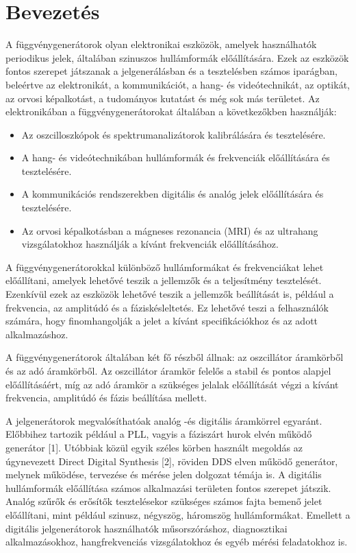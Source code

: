 \documentclass[a4paper,12pt]{article}
\begin{document}
	\section{Bevezetés}
		A függvénygenerátorok olyan elektronikai eszközök, amelyek használhatók periodikus jelek, általában szinuszos hullámformák előállítására. Ezek az eszközök fontos szerepet játszanak a jelgenerálásban és a tesztelésben számos iparágban, beleértve az elektronikát, a kommunikációt, a hang- és videótechnikát, az optikát, az orvosi képalkotást, a tudományos kutatást és még sok más területet.
		Az elektronikában a függvénygenerátorokat általában a következőkben használják:
		\begin{itemize}
		\item Az oszcilloszkópok és spektrumanalizátorok kalibrálására és tesztelésére.
		\item A hang- és videótechnikában hullámformák és frekvenciák előállítására és tesztelésére.
		\item A kommunikációs rendszerekben digitális és analóg jelek előállítására és tesztelésére.
		\item Az orvosi képalkotásban a mágneses rezonancia (MRI) és az ultrahang vizsgálatokhoz használják a kívánt frekvenciák előállításához.
		\end{itemize}
	
		A függvénygenerátorokkal különböző hullámformákat és frekvenciákat lehet előállítani, amelyek lehetővé teszik a jellemzők és a teljesítmény tesztelését. Ezenkívül ezek az eszközök lehetővé teszik a jellemzők beállítását is, például a frekvencia, az amplitúdó és a fáziskésleltetés. Ez lehetővé teszi a felhasználók számára, hogy finomhangolják a jelet a kívánt specifikációkhoz és az adott alkalmazáshoz.
		
		A függvénygenerátorok általában két fő részből állnak: az oszcillátor áramkörből és az adó áramkörből. Az oszcillátor áramkör felelős a stabil és pontos alapjel előállításáért, míg az adó áramkör a szükséges jelalak előállítását végzi a kívánt frekvencia, amplitúdó és fázis beállítása mellett. 
		
		A jelgenerátorok megvalósíthatóak analóg -és digitális áramkörrel egyaránt. Előbbihez tartozik például a PLL, vagyis a fáziszárt hurok elvén működő generátor [1]. Utóbbiak közül egyik széles körben használt megoldás az úgynevezett Direct Digital Synthesis [2], röviden DDS elven működő generátor, melynek működése, tervezése és mérése jelen dolgozat témája is. A digitális hullámformák előállítása számos alkalmazási területen fontos szerepet játszik. Analóg szűrők és erősítők tesztelésekor szükséges számos fajta bemenő jelet előállítani, mint például szinusz, négyszög, háromszög hullámformákat. Emellett a digitális jelgenerátorok használhatók műsorszóráshoz, diagnosztikai alkalmazásokhoz, hangfrekvenciás vizsgálatokhoz és egyéb mérési feladatokhoz is.		
		
\end{document}
